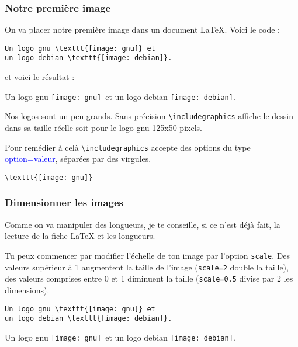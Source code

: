 \documentclass[10pt,hyperref={pdfpagemode=FullScreen},xcolor=dvipsnames,xcolor=table, xcolor=svgnames]{beamer}%
\newcommand{\latex}{\LaTeX\xspace}
\begin{document}
 \begin{frame}[fragile]
   \frametitle{Notre première image}
 
On va placer notre première image dans un document \latex. Voici le code :
\par
\begin{exampleblock}{}
\begin{verbatim}
Un logo gnu \texttt{[image: gnu]} et
un logo debian \texttt{[image: debian]}.
\end{verbatim}
\end{exampleblock}
et voici le résultat :
\begin{block}{}
Un logo gnu \texttt{[image: gnu]}\, et un logo debian \texttt{[image: debian]}.
\end{block}
Nos logos sont un peu grands. Sans précision {\color{blue}\verb"\includegraphics"} affiche le dessin dans sa taille réelle soit pour le logo gnu 125x50 pixels.
\par
Pour remédier à celà {\color{blue}\verb"\includegraphics"} accepte des options du type \textcolor{blue}{option=valeur}, séparées par des virgules.
\begin{exampleblock}{}
\verb"\texttt{[image: gnu]}"
\end{exampleblock}
\end{frame}
 \begin{frame}[fragile]
   \frametitle{Dimensionner les images}
Comme on va manipuler des longueurs, je te conseille, si ce n'est déjà fait, la lecture de la fiche \og\latex et les longueurs\fg.\par
Tu peux commencer par modifier l'échelle de ton image par l'option {\color{blue}\verb!scale!}. Des valeurs supérieur à 1 augmentent la taille de l'image  ({\color{blue}\verb!scale=2!} double la taille), des valeurs comprises entre 0 et 1 diminuent la taille ({\color{blue}\verb!scale=0.5!} divise par 2 les dimensions).
\begin{exampleblock}{}
\begin{verbatim}
Un logo gnu \texttt{[image: gnu]} et
un logo debian \texttt{[image: debian]}.
\end{verbatim}
\end{exampleblock}
\begin{block}{}
Un logo gnu \texttt{[image: gnu]}\, et un logo debian \texttt{[image: debian]}.
\end{block}
\end{frame}
\end{document}
